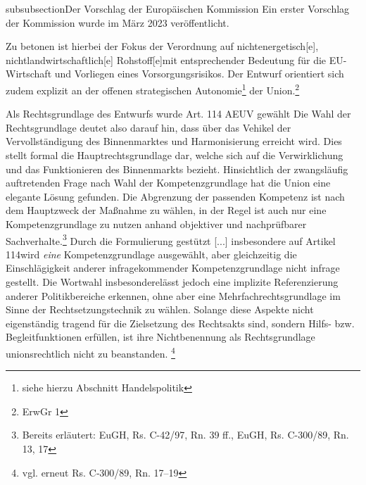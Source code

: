 \documentclass[12pt,a4paper,oneside]{book} %
\begin{document}
	subsubsection{Der Vorschlag der Europäischen Kommission}
	Ein erster Vorschlag der Kommission wurde im März 2023 veröffentlicht.
	
	Zu betonen ist hierbei der Fokus der Verordnung auf \glqq nichtenergetisch[e], nichtlandwirtschaftlich[e] Rohstoff[e]\grqq mit entsprechender Bedeutung für die EU-Wirtschaft und Vorliegen eines Vorsorgungsrisikos. Der Entwurf orientiert sich zudem explizit an der offenen strategischen Autonomie\footnote{siehe hierzu Abschnitt Handelspolitik} der Union.\footnote{ErwGr 1}
	
	Als Rechtsgrundlage des Entwurfs wurde Art. 114 AEUV gewählt
	Die Wahl der Rechtsgrundlage deutet also darauf hin, dass über das Vehikel der Vervollständigung des Binnenmarktes und Harmonisierung erreicht wird.  Dies stellt formal die Hauptrechtsgrundlage dar, welche sich auf die Verwirklichung und das Funktionieren des Binnenmarkts bezieht.
	Hinsichtlich der zwangsläufig auftretenden Frage nach Wahl der Kompetenzgrundlage hat die Union eine elegante Lösung gefunden. Die Abgrenzung der passenden Kompetenz ist nach dem Hauptzweck der Maßnahme zu wählen, in der Regel ist auch nur eine Kompetenzgrundlage zu nutzen anhand objektiver und nachprüfbarer Sachverhalte.\footnote{Bereits erläutert: EuGH, Rs. C-42/97, Rn. 39 ff., EuGH, Rs. C-300/89, Rn. 13, 17} Durch die Formulierung \glqq gestützt [...] insbesondere auf Artikel 114\grqq wird \textit{eine} Kompetenzgrundlage ausgewählt, aber gleichzeitig die Einschlägigkeit anderer infragekommender Kompetenzgrundlage nicht infrage gestellt. Die Wortwahl \glqq insbesondere\grqq lässt jedoch eine implizite Referenzierung anderer Politikbereiche erkennen, ohne aber eine  Mehrfachrechtsgrundlage im Sinne der Rechtsetzungstechnik zu wählen. Solange diese Aspekte nicht eigenständig tragend für die Zielsetzung des Rechtsakts sind, sondern Hilfs- bzw. Begleitfunktionen erfüllen, ist ihre Nichtbenennung als Rechtsgrundlage unionsrechtlich nicht zu beanstanden. \footnote{vgl. erneut Rs. C‑300/89, Rn. 17–19}
	
\end{document}
